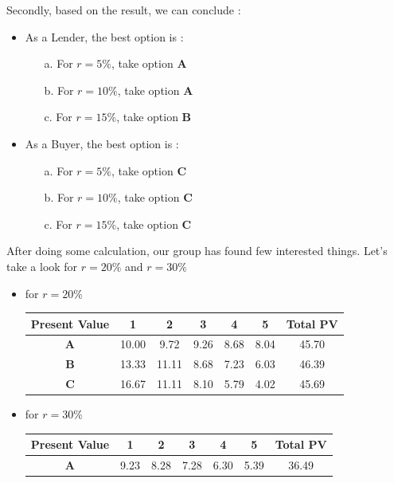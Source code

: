 \documentclass{article}
\begin{document}
\begin{enumerate}
\begin{itemize}
\begin{center}
			\end{center}
		\end{itemize}
	Secondly, based on the result, we can conclude :
	\begin{itemize}
		\item As a Lender, the best option is :
		\begin{itemize}
			\item[a.] For $r=5\%$, take option \textbf{A}
			\item[b.] For $r=10\%$, take option \textbf{A}
			\item[c.] For $r=15\%$, take option \textbf{B}
		\end{itemize}
		\item As a Buyer, the best option is : 
		\begin{itemize}
			\item[a.] For $r=5\%$, take option \textbf{C}
			\item[b.] For $r=10\%$, take option \textbf{C}
			\item[c.] For $r=15\%$, take option \textbf{C}
		\end{itemize}
	\end{itemize}
	\vspace{0.5cm}
	After doing some calculation, our group has found few interested things. Let's take a look for $r=20\%$ and $r=30\%$
	\begin{itemize}
		\item for $r=20\%$
		\begin{center}
			\begin{tabular}{|c|c|c|c|c|c|c|}
				\hline
				\textbf{Present Value }&\textbf{1}&\textbf{2}&\textbf{3}&\textbf{4}&\textbf{5}&\textbf{Total PV}\\\hline
				\textbf{A}&10.00&9.72&9.26&8.68&8.04&45.70\\\hline
				\textbf{B}&13.33&11.11&8.68&7.23&6.03&46.39\\\hline
				\textbf{C}&16.67&11.11&8.10&5.79&4.02&45.69\\\hline
			\end{tabular}
		\end{center}
		\item for $r=30\%$
		\begin{center}
			\begin{tabular}{|c|c|c|c|c|c|c|}
				\hline
				\textbf{Present Value }&\textbf{1}&\textbf{2}&\textbf{3}&\textbf{4}&\textbf{5}&\textbf{Total PV}\\\hline
				\textbf{A}&9.23&8.28&7.28&6.30&5.39&36.49\\\hline

\end{tabular}
\end{center}
\end{itemize}
\end{enumerate}
\end{document}
